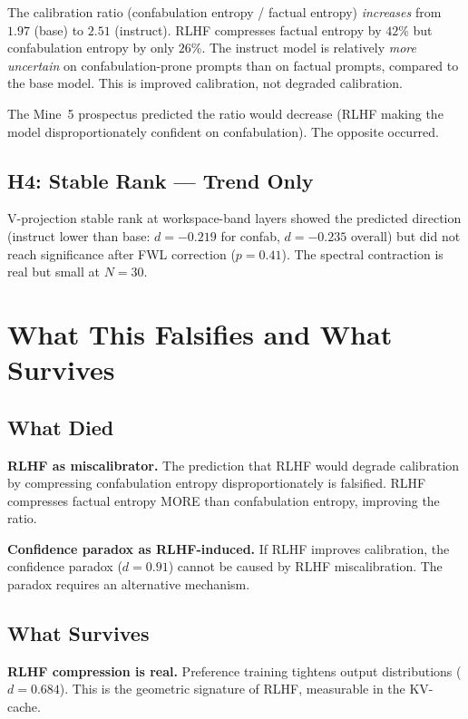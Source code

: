 \documentclass[11pt,a4paper]{article}
\begin{document}
The calibration ratio (confabulation entropy / factual entropy)
\emph{increases} from $1.97$ (base) to $2.51$ (instruct). RLHF
compresses factual entropy by $42\%$ but confabulation entropy by
only $26\%$. The instruct model is relatively \emph{more uncertain}
on confabulation-prone prompts than on factual prompts, compared to
the base model. This is improved calibration, not degraded
calibration.

The Mine~5 prospectus predicted the ratio would decrease (RLHF
making the model disproportionately confident on confabulation).
The opposite occurred.

\subsection{H4: Stable Rank --- Trend Only}

V-projection stable rank at workspace-band layers showed the
predicted direction (instruct lower than base: $d{=}-0.219$ for
confab, $d{=}-0.235$ overall) but did not reach significance after
FWL correction ($p{=}0.41$). The spectral contraction is real but
small at $N{=}30$.

\section{What This Falsifies and What Survives}
\label{sec:discussion}

\subsection{What Died}

\textbf{RLHF as miscalibrator.} The prediction that RLHF would
degrade calibration by compressing confabulation entropy
disproportionately is falsified. RLHF compresses factual entropy
MORE than confabulation entropy, improving the ratio.

\textbf{Confidence paradox as RLHF-induced.} If RLHF improves
calibration, the confidence paradox ($d{=}0.91$) cannot be caused by
RLHF miscalibration. The paradox requires an alternative mechanism.

\subsection{What Survives}

\textbf{RLHF compression is real.} Preference training tightens
output distributions ($d{=}0.684$). This is the geometric signature
of RLHF, measurable in the KV-cache.
\end{document}
